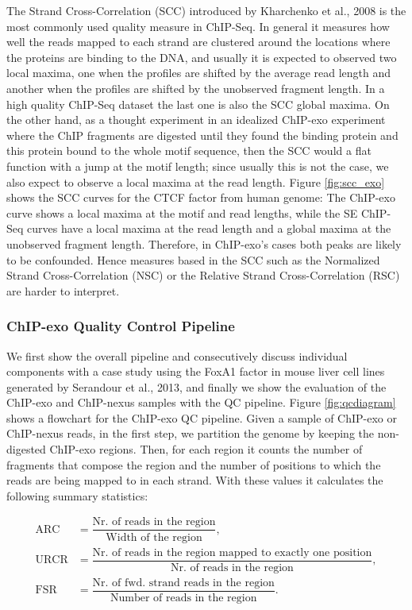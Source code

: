 \documentclass{bmcart}
\begin{document}
The Strand Cross-Correlation (SCC) introduced by Kharchenko et al.,
2008\nocite{strandcc} is the most commonly used quality measure in
ChIP-Seq. In general it measures how well the reads mapped to each
strand are clustered around the locations where the proteins are
binding to the DNA, and usually it is expected to observed two local
maxima, one when the profiles are shifted by the average read length
and another when the profiles are shifted by the unobserved fragment
length. In a high quality ChIP-Seq dataset the last one is also the
SCC global maxima. On the other hand, as a thought experiment in an
idealized ChIP-exo experiment where the ChIP fragments are digested
until they found the binding protein and this protein bound to the
whole motif sequence, then the SCC would a flat function with a jump
at the motif length; since usually this is not the case, we also
expect to observe a local maxima at the read length. Figure
\ref{fig:scc_exo} shows the SCC curves for the CTCF factor from human
genome: The ChIP-exo curve shows a local maxima at the motif and read
lengths, while the SE ChIP-Seq curves have a local maxima at the read
length and a global maxima at the unobserved fragment
length. Therefore, in ChIP-exo's cases both peaks are likely to be
confounded. Hence measures based in the SCC such as the Normalized
Strand Cross-Correlation (NSC) or the Relative Strand
Cross-Correlation (RSC) are harder to interpret.

\subsubsection*{ChIP-exo Quality Control Pipeline}

We first show the overall pipeline and consecutively discuss
individual components with a case study using the FoxA1 factor in
mouse liver cell lines generated by Serandour et al., 2013, and
finally we show the evaluation of the ChIP-exo and ChIP-nexus samples
with the QC pipeline. Figure \ref{fig:qcdiagram} shows a flowchart for
the ChIP-exo QC pipeline. Given a sample of ChIP-exo or ChIP-nexus
reads, in the first step, we partition the genome by keeping the
non-digested ChIP-exo regions. Then, for each region it counts the
number of fragments that compose the region and the number of
positions to which the reads are being mapped to in each strand. With
these values it calculates the following summary statistics:

\begin{align*}
  \text{ARC} &= \dfrac{\text{Nr. of reads in the region}}{\text{Width of the region}}, \\
  \text{URCR} &= \dfrac{\text{Nr. of reads in the region mapped to
      exactly one position}}{\text{Nr. of reads in the region}}, \\
  \text{FSR} &= \dfrac{\text{Nr. of fwd. strand reads in the
      region}}{\text{Number of reads in the region}}.
\end{align*}
\end{document}
